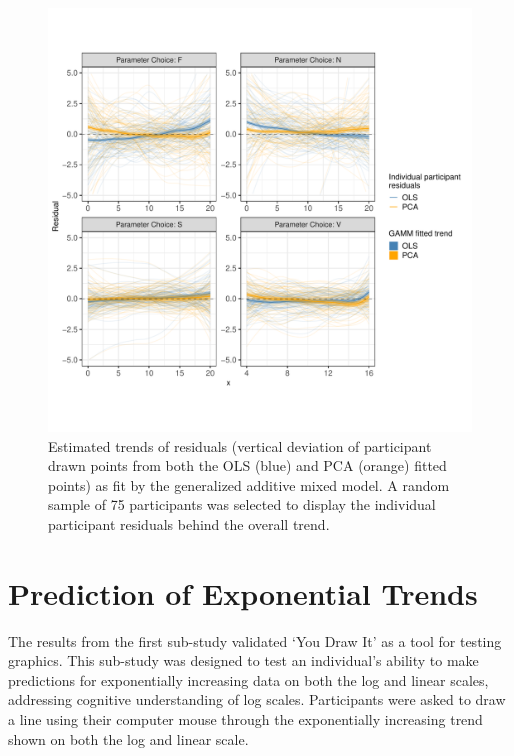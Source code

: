\documentclass[print]{nuthesis}
\begin{document}
\begin{figure}[tbp]

{\centering \includegraphics[width=1\linewidth,]{thesis_files/figure-latex/eyefitting-gamm-residualplots-1} 

}

\caption[Eye Fitting Straight Lines in the Modern Era GAMM results]{Estimated trends of residuals (vertical deviation of participant drawn points from both the OLS (blue) and PCA (orange) fitted points) as fit by the generalized additive mixed model. A random sample of 75 participants was selected to display the individual participant residuals behind the overall trend.}\label{fig:eyefitting-gamm-residualplots}
\end{figure}

\hypertarget{prediction-of-exponential-trends}{%
\section{Prediction of Exponential Trends}\label{prediction-of-exponential-trends}}

The results from the first sub-study validated `You Draw It' as a tool for testing graphics.
This sub-study was designed to test an individual's ability to make predictions for exponentially increasing data on both the log and linear scales, addressing cognitive understanding of log scales.
Participants were asked to draw a line using their computer mouse through the exponentially increasing trend shown on both the log and linear scale.
\end{document}
